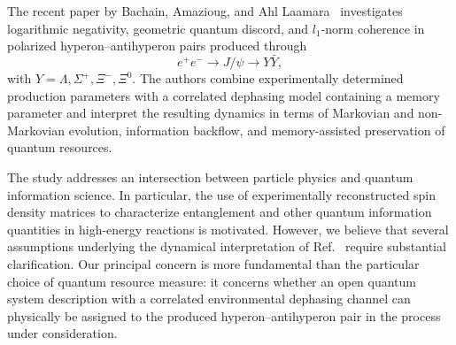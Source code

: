 \documentclass[epjc,twocolumn,nofootinbib,preprintnumbers,amsmath,amssymb]{revtex4-2}
\begin{document}

The recent paper by Bachain, Amazioug, and Ahl Laamara~\cite{Bachain} investigates logarithmic negativity, geometric quantum discord, and $l_1$-norm coherence in polarized hyperon--antihyperon pairs produced through
\begin{equation}
e^+e^-\rightarrow J/\psi\rightarrow Y\bar Y,
\end{equation}
with $Y=\Lambda,\Sigma^+,\Xi^-,\Xi^0$. The authors combine experimentally determined production parameters with a correlated dephasing model containing a memory parameter and interpret the resulting dynamics in terms of Markovian and non-Markovian evolution, information backflow, and memory-assisted preservation of quantum resources.

The study addresses an intersection between particle physics and quantum information science. In particular, the use of experimentally reconstructed spin density matrices to characterize entanglement and other quantum information quantities in high-energy reactions is motivated. However, we believe that several assumptions underlying the dynamical interpretation of Ref.~\cite{Bachain} require substantial clarification. Our principal concern is more fundamental than the particular choice of quantum resource measure: it concerns whether an open quantum system description with a correlated environmental dephasing channel can physically be assigned to the produced hyperon--antihyperon pair in the process under consideration.
\end{document}
